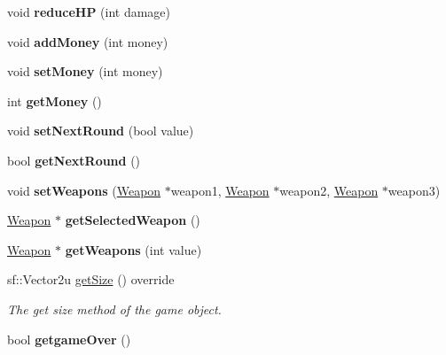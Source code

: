 \begin{DoxyCompactItemize}
\item 
\hypertarget{class_player_ae03528c4ade65b66ed097a2b622d59a5}{void {\bfseries reduce\+H\+P} (int damage)}\label{class_player_ae03528c4ade65b66ed097a2b622d59a5}

\item 
\hypertarget{class_player_a0f592e3e7e589f40dc5144d1d58283f2}{void {\bfseries add\+Money} (int money)}\label{class_player_a0f592e3e7e589f40dc5144d1d58283f2}

\item 
\hypertarget{class_player_a6e78f6a0e2e73323bf200a9e1c2e0ac6}{void {\bfseries set\+Money} (int money)}\label{class_player_a6e78f6a0e2e73323bf200a9e1c2e0ac6}

\item 
\hypertarget{class_player_ac45154df7c4eb2d1d58255c3ff1c55dd}{int {\bfseries get\+Money} ()}\label{class_player_ac45154df7c4eb2d1d58255c3ff1c55dd}

\item 
\hypertarget{class_player_a7429c38bfd16ded1b2a11af1b0673ba3}{void {\bfseries set\+Next\+Round} (bool value)}\label{class_player_a7429c38bfd16ded1b2a11af1b0673ba3}

\item 
\hypertarget{class_player_ad0c154bef16fa0c1c3e4c6efb124d420}{bool {\bfseries get\+Next\+Round} ()}\label{class_player_ad0c154bef16fa0c1c3e4c6efb124d420}

\item 
\hypertarget{class_player_a0fca3ee9cea38e8944663f19a0cdb27b}{void {\bfseries set\+Weapons} (\hyperlink{class_weapon}{Weapon} $\ast$weapon1, \hyperlink{class_weapon}{Weapon} $\ast$weapon2, \hyperlink{class_weapon}{Weapon} $\ast$weapon3)}\label{class_player_a0fca3ee9cea38e8944663f19a0cdb27b}

\item 
\hypertarget{class_player_ab087a0124f92c63e91cc846db9b82b76}{\hyperlink{class_weapon}{Weapon} $\ast$ {\bfseries get\+Selected\+Weapon} ()}\label{class_player_ab087a0124f92c63e91cc846db9b82b76}

\item 
\hypertarget{class_player_af442b7ed41244bba619d1a2ef8812123}{\hyperlink{class_weapon}{Weapon} $\ast$ {\bfseries get\+Weapons} (int value)}\label{class_player_af442b7ed41244bba619d1a2ef8812123}

\item 
sf\+::\+Vector2u \hyperlink{class_player_a9b815bbbc9cb8332549acc10d03c7c0b}{get\+Size} () override
\begin{DoxyCompactList}\small\item\em The get size method of the game object. \end{DoxyCompactList}\item 
\hypertarget{class_player_a1d3d8988bfe2487e1ef7d82502171c8e}{bool {\bfseries getgame\+Over} ()}\label{class_player_a1d3d8988bfe2487e1ef7d82502171c8e}


\end{DoxyCompactItemize}
